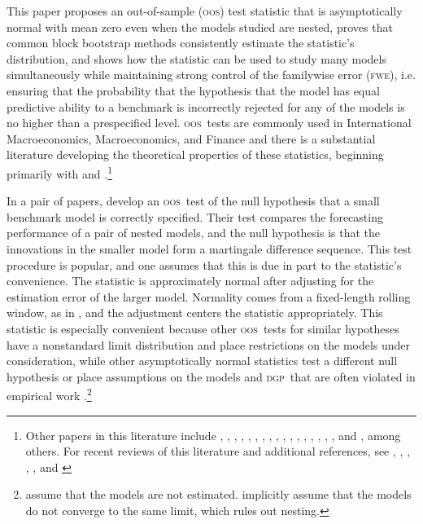 \documentclass[10pt,fleqn,draft]{article}
\theoremstyle{definition}
\newcommand{\dgp}{\textsc{dgp}}
\newcommand{\fwe}{\textsc{fwe}}
\newcommand{\oos}{\textsc{oos}}
\begin{document}
\newpage \noindent This paper proposes an out-of-sample (\oos) test
statistic that is asymptotically normal with mean zero even when the
models studied are nested, proves that common block bootstrap methods
consistently estimate the statistic's distribution, and shows how the
statistic can be used to study many models simultaneously while
maintaining strong control of the familywise error (\fwe),
i.e. ensuring that the probability that the hypothesis that the model
has equal predictive ability to a benchmark is incorrectly rejected
for any of the models is no higher than a prespecified level.  \oos\
tests are commonly used in International Macroeconomics,
Macroeconomics, and Finance \citep[see, for
example,][]{MeR:83,StW:03,GoW:08} and there is a substantial
literature developing the theoretical properties of these statistics,
beginning primarily with \citet{DiM:95} and
\citet{Wes:96}.\footnote{Other papers in this literature include
  \citet{WeM:98}, \citet{Mcc:98,Mcc:00},
  \citet{ClM:01,ClM:05-2,ClM:05,ClM:09b,ClM:11b,ClM:11},
  \citet{CCS:01}, \citet{CoS:02,CoS:04,CoS:07}, \citet{Whi:00},
  \citet{InK:04,InK:06}, \citet{Han:05}, \citet{Ros:05},
  \citet{ClW:06,ClW:07}, \citet{Ana:07}, \citet{GiR:09,GiR:10},
  \citet{HuW:10}, \citet{HLN:11}, \cite{InR:11}, \cite{Pin:11},
  \cite{RoS:11,RoS:11b}, and \citet{Cal:11}, among others.  For recent
  reviews of this literature and additional references, see
  \citet{McW:02}, \citet{CoS:06}, \citet{Wes:06}, \citet{ClM:11c},
  \citet{CoD:11}, and \citet{Gia:11}}

In a pair of papers, \citet{ClW:06,ClW:07} develop an \oos\ test of
the null hypothesis that a small benchmark model is correctly
specified.  Their test compares the forecasting performance of a pair
of nested models, and the null hypothesis is that the innovations in
the smaller model form a martingale difference sequence.  This test
procedure is popular, and one assumes that this is due in part to the
statistic's convenience.  The statistic is approximately normal after
adjusting for the estimation error of the larger model.  Normality
comes from a fixed-length rolling window, as in \citet{GiW:06}, and
the adjustment centers the statistic appropriately.  This statistic is
especially convenient because other \oos\ tests for similar hypotheses
\citep[among others]{Mcc:07,ClM:05,ClM:01,CoS:04,CoS:02,CCS:01} have a
nonstandard limit distribution and place restrictions on the models
under consideration, while other asymptotically normal statistics test
a different null hypothesis \citep{GiW:06} or place assumptions on the
models and \dgp\ that are often violated in empirical work
\citep{Wes:96,WeM:98,Mcc:00,DiM:95}.\footnote{\citet{DiM:95} assume
  that the models are not estimated. \citet{Wes:96,WeM:98,Mcc:00}
  implicitly assume that the models do not converge to the same limit,
  which rules out nesting.}
\end{document}

